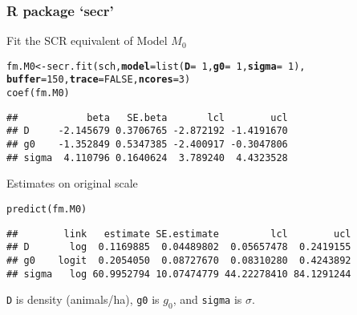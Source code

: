 \documentclass[color=usenames,dvipsnames]{beamer}\usepackage[]{graphicx}\usepackage[]{color}
\makeatletter
\newcommand{\hlnum}[1]{\textcolor[rgb]{0.69,0.494,0}{#1}}%
\newcommand{\hlopt}[1]{\textcolor[rgb]{0,0,0}{#1}}%
\newcommand{\hlstd}[1]{\textcolor[rgb]{0,0,0}{#1}}%
\newcommand{\hlkwb}[1]{\textcolor[rgb]{0,0.341,0.682}{#1}}%
\newcommand{\hlkwc}[1]{\textcolor[rgb]{0,0,0}{\textbf{#1}}}%
\newcommand{\hlkwd}[1]{\textcolor[rgb]{0.004,0.004,0.506}{#1}}%
\newenvironment{kframe}{%
 \def\at@end@of@kframe{}%
 \ifinner\ifhmode%
  \def\at@end@of@kframe{\end{minipage}}%
  \begin{minipage}{\columnwidth}%
 \fi\fi%
 \def\FrameCommand##1{\hskip\@totalleftmargin \hskip-\fboxsep
 \colorbox{shadecolor}{##1}\hskip-\fboxsep
     \hskip-\linewidth \hskip-\@totalleftmargin \hskip\columnwidth}%
 \MakeFramed {\advance\hsize-\width
   \@totalleftmargin\z@ \linewidth\hsize
   \@setminipage}}%
 {\par\unskip\endMakeFramed%
 \at@end@of@kframe}
\newenvironment{knitrout}{}{} %
\newcommand{\inr}[1]{\colorbox{inlinecolor}{\texttt{#1}}}
\makeatother
\begin{document}
\begin{frame}[fragile]
  \frametitle{R package `secr'}
  Fit the SCR equivalent of Model $M_0$
\begin{knitrout}\scriptsize
{}\color{fgcolor}\begin{kframe}
\begin{alltt}
\hlstd{fm.M0} \hlkwb{<-} \hlkwd{secr.fit}\hlstd{(sch,} \hlkwc{model}\hlstd{=}\hlkwd{list}\hlstd{(}\hlkwc{D}\hlstd{=}\hlopt{~}\hlnum{1}\hlstd{,} \hlkwc{g0}\hlstd{=}\hlopt{~}\hlnum{1}\hlstd{,} \hlkwc{sigma}\hlstd{=}\hlopt{~}\hlnum{1}\hlstd{),}
                  \hlkwc{buffer}\hlstd{=}\hlnum{150}\hlstd{,} \hlkwc{trace}\hlstd{=}\hlnum{FALSE}\hlstd{,} \hlkwc{ncores}\hlstd{=}\hlnum{3}\hlstd{)}
\hlkwd{coef}\hlstd{(fm.M0)}
\end{alltt}
\begin{verbatim}
##            beta   SE.beta       lcl        ucl
## D     -2.145679 0.3706765 -2.872192 -1.4191670
## g0    -1.352849 0.5347385 -2.400917 -0.3047806
## sigma  4.110796 0.1640624  3.789240  4.4323528
\end{verbatim}
\end{kframe}
\end{knitrout}
\pause
\vfill
Estimates on original scale
\begin{knitrout}\scriptsize
{}\color{fgcolor}\begin{kframe}
\begin{alltt}
\hlkwd{predict}\hlstd{(fm.M0)}
\end{alltt}
\begin{verbatim}
##        link   estimate SE.estimate         lcl        ucl
## D       log  0.1169885  0.04489802  0.05657478  0.2419155
## g0    logit  0.2054050  0.08727670  0.08310280  0.4243892
## sigma   log 60.9952794 10.07474779 44.22278410 84.1291244
\end{verbatim}
\end{kframe}
\end{knitrout}
\inr{D} is density (animals/ha), \inr{g0} is $g_0$, and \inr{sigma} is 
$\sigma$.   
\end{frame}
\end{document}
